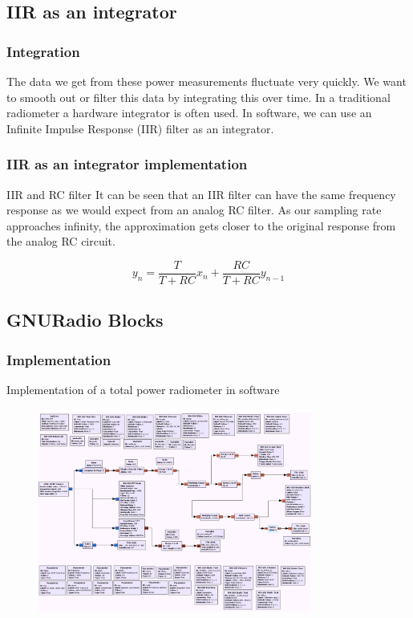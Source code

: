 \documentclass[notes]{beamer}
\begin{document}
\subsection{IIR as an integrator}
\begin{frame}
\frametitle{Integration}
The data we get from these power measurements fluctuate very quickly.  We want to smooth out or filter this data by integrating this over time.  In a traditional radiometer a hardware integrator is often used.  In software, we can use an Infinite Impulse Response (IIR) filter as an integrator.
\end{frame}
\begin{frame}
\frametitle{IIR as an integrator implementation}
\begin{block}{IIR and RC filter}
It can be seen that an IIR filter can have the same frequency response as we would expect from an analog RC filter.  As our sampling rate approaches infinity, the approximation gets closer to the original response from the analog RC circuit.  
\end{block}
\begin{equation}\label{final_IIR_RC}
y_n=\frac{T}{T+RC}x_n+\frac{RC}{T+RC}y_{n-1}
\end{equation}
\end{frame}

\subsection{GNURadio Blocks}
\begin{frame}
\frametitle{Implementation}

Implementation of a total power radiometer in software 

\begin{figure}\label{GNURadio_Block}
\includegraphics[width=9cm]{images/GNURadio_Block_tpr.png}
\end{figure}

\end{frame}
\end{document}
